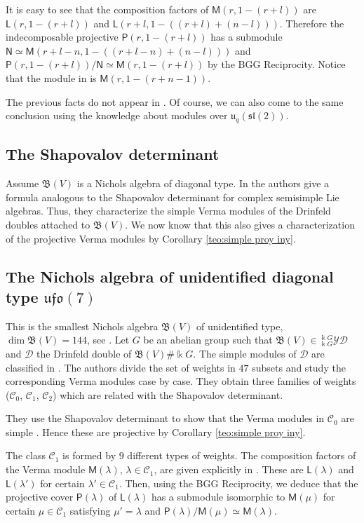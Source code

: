 \documentclass[reqno]{amsart}
\renewcommand{\_}[1]{_{\left( #1 \right)}}
\renewcommand{\^}[1]{^{\left( #1 \right)}}
\newcommand{\ku}{\Bbbk}
\newcommand\fL{\mathsf{L}}
\newcommand\fM{\mathsf{M}}
\newcommand\fN{\mathsf{N}}
\newcommand\fP{\mathsf{P}}
\newcommand{\D}{\mathcal{D}}
\newcommand{\BV}{{\mathfrak B}}
\newcommand{\ydg}{{}^{\ku G}_{\ku G}\mathcal{YD}}
\theoremstyle{plain}
\theoremstyle{definition}
\theoremstyle{remark}
\begin{document}
It is easy to see that the composition factors of $\fM(r,1-(r+l))$ are $\fL(r,1-(r+l))$ and $\fL(r+l,1-\left((r+l)+(n-l)\right))$. Therefore the indecomposable projective $\fP(r,1-(r+l))$ has a submodule $\fN\simeq\fM(r+l-n,1-\left((r+l-n)+(n-l)\right))$ and $\fP(r,1-(r+l))/\fN\simeq\fM(r,1-(r+l))$ by the BGG Reciprocity. Notice that the module in \cite[Remark 2.8]{MR1743667} is $\fM(r,1-(r+n-1))$.

The previous facts do not appear in \cite{MR1743667}. Of course, we can also come to the same conclusion using the knowledge about modules over $\mathfrak{u}_q(\mathfrak{sl}(2))$.

\subsection{The Shapovalov determinant} Assume $\BV(V)$ is a Nichols algebra of diagonal type. In \cite{MR2840165} the authors give a formula  analogous to  the Shapovalov determinant for complex semisimple Lie algebras. Thus, they characterize the simple Verma modules of the Drinfeld doubles attached to $\BV(V)$. We now know that this also gives a characterization of the projective Verma modules by Corollary \ref{teo:simple proy iny}.


\subsection{The Nichols algebra of unidentified diagonal type \texorpdfstring{$\mathfrak{ufo}(7)$}{ufo7}} %

This is the smallest Nichols algebra $\BV(V)$ of unidentified type, $\dim\BV(V)=144$, see \cite{MR3169545}. Let $G$ be an abelian group such that $\BV(V)\in\ydg$ and $\D$ the Drinfeld double of $\BV(V)\#\ku G$. The simple modules of $\D$ are classified in \cite{ufo7}. The authors divide the set of weights in $47$ subsets and study the corresponding Verma modules case by case. They obtain three families of weights ($\mathcal{C}_0$, $\mathcal{C}_1$, $\mathcal{C}_2$) which are related with the Shapovalov determinant.

They use the Shapovalov determinant to show that the Verma modules in $\mathcal{C}_0$ are simple \cite[Lemma 1.6]{ufo7}. Hence these are projective by Corollary \ref{teo:simple proy iny}.

The class $\mathcal{C}_1$ is formed by $9$ different types of weights. The composition factors of the Verma module $\fM(\lambda)$, $\lambda\in\mathcal{C}_1$, are given explicitly in \cite[Section 2]{ufo7}. These are $\fL(\lambda)$ and $\fL(\lambda')$ for certain $\lambda'\in\mathcal{C}_1$. Then, using the BGG Reciprocity, we deduce that the projective cover $\fP(\lambda)$ of $\fL(\lambda)$ has a submodule isomorphic to $\fM(\mu)$ for certain $\mu\in\mathcal{C}_1$ satisfying $\mu'=\lambda$ and $\fP(\lambda)/\fM(\mu)\simeq\fM(\lambda)$.
\end{document}
